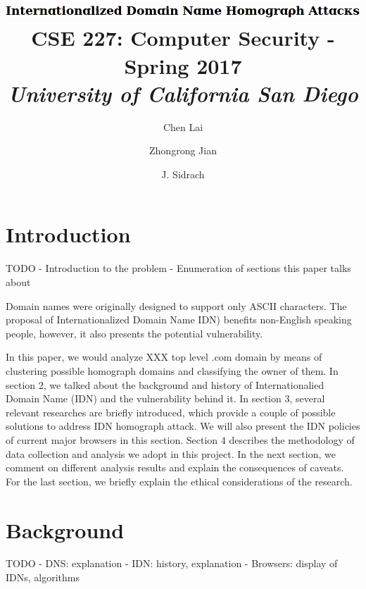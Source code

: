 \documentclass[letterpaper,twocolumn,10pt]{article}
\begin{document}
\date{}

\title{\Large
\includegraphics[height=\baselineskip]{title.png}
\\ \vspace{0.65mm} \large \normalfont
CSE 227: Computer Security - Spring 2017 \\ \textit{
University of California San Diego
}}

\author{
{\rm Chen Lai}\\
\and
{\rm Zhongrong Jian}\\
\and
{\rm J. Sidrach}\\
}

\maketitle


\section{Introduction}
TODO
- Introduction to the problem
- Enumeration of sections this paper talks about

Domain names were originally designed to support only ASCII characters.
The proposal of Internationalized Domain Name IDN) benefits non-English speaking people, however, it also presents the potential vulnerability.

In this paper, we would analyze XXX top level .com domain by means of clustering possible homograph domains and classifying the owner of them.
In section 2, we talked about the background and history of Internationalied Domain Name (IDN) and the vulnerability behind it.
In section 3, several relevant researches are briefly introduced, which provide a couple of possible solutions to address IDN homograph attack.
We will also present the IDN policies of current major browsers in this section.
Section 4 describes the methodology of data collection and analysis we adopt in this project.
In the next section, we comment on different analysis results and explain the consequences of caveats.
For the last section, we briefly explain the ethical considerations of the research.

\section{Background}
TODO
- DNS: explanation
- IDN: history, explanation
- Browsers: display of IDNs, algorithms
\end{document}
